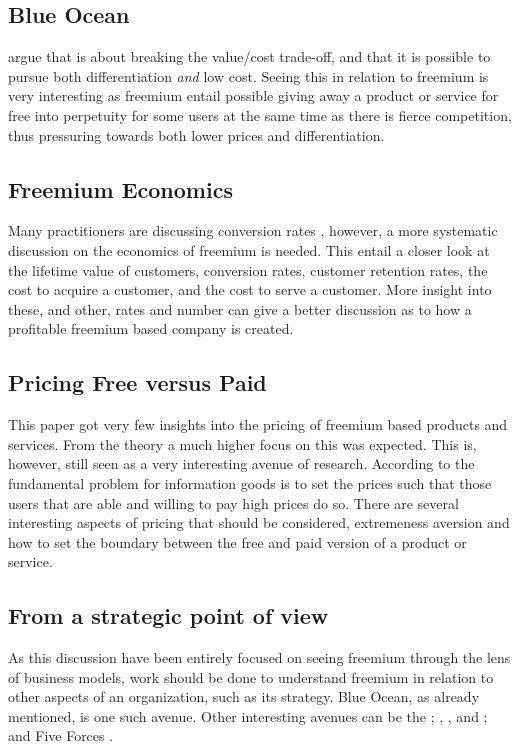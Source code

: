 \subsection{Blue Ocean}

\citet{kim2004} argue that  is about breaking the value/cost trade-off, and that it is possible to pursue both differentiation \emph{and} low cost. Seeing this in relation to freemium is very interesting as freemium entail possible giving away a product or service for free into perpetuity for some users at the same time as there is fierce competition, thus pressuring towards both lower prices and differentiation. 

\subsection{Freemium Economics}

Many practitioners are discussing conversion rates \citep[\eg][]{anderson2008,chen2009,loan2009,asay2009}, however, a more systematic discussion on the economics of freemium is needed. This entail a closer look at the lifetime value of customers, conversion rates, customer retention rates, the cost to acquire a customer, and the cost to serve a customer. More insight into these, and other, rates and number can give a better discussion as to how a profitable freemium based company is created.

\subsection{Pricing \oldand Free versus Paid}

This paper got very few insights into the pricing of freemium based products and services. From the theory a much higher focus on this was expected. This is, however, still seen as a very interesting avenue of research. According to \citet{varian1997} the fundamental problem for information goods is to set the prices such that those users that are able and willing to pay high prices do so. There are several interesting aspects of pricing that should be considered, \eg extremeness aversion and how to set the boundary between the free and paid version of a product or service.

\subsection{From a strategic point of view}

As this discussion have been entirely focused on seeing freemium through the lens of business models, work should be done to understand freemium in relation to other aspects of an organization, such as its strategy. Blue Ocean, as already mentioned, is one such avenue. Other interesting avenues can be the  \citep{norton1992}; , , and  \citep{stabell1998}; and {Five Forces} \citep{porter1985}.

